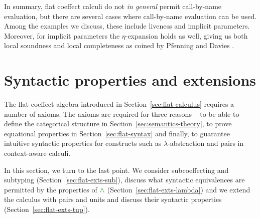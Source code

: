\noindent
In summary, flat coeffect calculi do not \emph{in general} permit call-by-name evaluation, but
there are several cases where call-by-name evaluation can be used. Among the examples we discuss,
these include liveness and implicit parameters. Moreover, for implicit parameters the
$\eta$-expansion holds as well, giving us both local soundness and local completeness as coined
by Pfenning and Davies \cite{logic-modal-reconstruction}.



%
%

\section{Syntactic properties and extensions}
\label{sec:flat-exts}

The flat coeffect algebra introduced in Section~\ref{sec:flat-calculus} requires a number of axioms.
The axioms are required for three reasons -- to be able to define the categorical structure
in Section~\ref{sec:semantics-theory}, to prove equational properties in Section~\ref{sec:flat-syntax}
and finally, to guarantee intuitive syntactic properties for constructs such as
$\lambda$-abstraction and pairs in context-aware calculi.

In this section, we turn to the last point. We consider subcoeffecting and subtyping
(Section~\ref{sec:flat-exts-sub}), discuss what syntactic equivalences are permitted
by the properties of $\czip$ (Section~\ref{sec:flat-exts-lambda}) and we extend the calculus with
pairs and units and discuss their syntactic properties (Section~\ref{sec:flat-exts-tup}).


